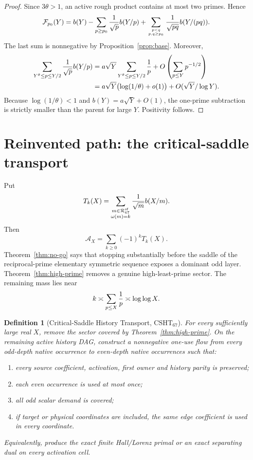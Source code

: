 \documentclass[11pt]{article}
\newtheorem{definition}[theorem]{Definition}
\newcommand{\Acal}{\mathcal A}
\newcommand{\Rcal}{\mathcal R}
\newcommand{\Fcal}{\mathcal F}
\newcommand{\CSHT}{\mathrm{CSHT}_{67}}
\begin{document}
\begin{proof}
Since $3\theta>1$, an active rough product contains at most two primes.  Hence
\[
 \Fcal_{p_0}(Y)=b(Y)
 -\sum_{p\ge p_0}{1\over\sqrt p}b(Y/p)
 +\sum_{p<q\atop p,q\ge p_0}{1\over\sqrt{pq}}b(Y/(pq)).
\]
The last sum is nonnegative by Proposition~\ref{prop:base}.  Moreover,
\begin{align*}
 \sum_{Y^\theta\le p\le Y/2}{1\over\sqrt p}b(Y/p)
 &=a\sqrt Y\sum_{Y^\theta\le p\le Y/2}{1\over p}
   +O\left(\sum_{p\le Y}p^{-1/2}\right)\\
 &=a\sqrt Y\bigl(\log(1/\theta)+o(1)\bigr)
   +O(\sqrt Y/\log Y).
\end{align*}
Because $\log(1/\theta)<1$ and $b(Y)=a\sqrt Y+O(1)$, the one-prime subtraction
is strictly smaller than the parent for large $Y$.  Positivity follows.
\end{proof}

\section{Reinvented path: the critical-saddle transport}

Put
\[
 T_k(X)=
 \sum_{\substack{m\in\Rcal_{67}^{\mathrm{sf}}\\\omega(m)=k}}
 {1\over\sqrt m}b(X/m).
\]
Then
\begin{equation}\label{eq:depth-series}
 \Acal_X=\sum_{k\ge0}(-1)^kT_k(X).
\end{equation}
Theorem~\ref{thm:no-go} says that stopping substantially before the saddle of
the reciprocal-prime elementary symmetric sequence exposes a dominant odd
layer.  Theorem~\ref{thm:high-prime} removes a genuine high-least-prime sector.
The remaining mass lies near
\[
 k\asymp\sum_{p\le X}{1\over p}\asymp\log\log X.
\]

\begin{definition}[Critical-Saddle History Transport, $\CSHT$]
For every sufficiently large real $X$, remove the sector covered by
Theorem~\ref{thm:high-prime}.  On the remaining active history DAG, construct a
nonnegative one-use flow from every odd-depth native occurrence to even-depth
native occurrences such that:
\begin{enumerate}
\item every source coefficient, activation, first owner and history parity is
      preserved;
\item each even occurrence is used at most once;
\item all odd scalar demand is covered;
\item if target or physical coordinates are included, the same edge
      coefficient is used in every coordinate.
\end{enumerate}
Equivalently, produce the exact finite Hall/Lorenz primal or an exact separating
dual on every activation cell.
\end{definition}
\end{document}
